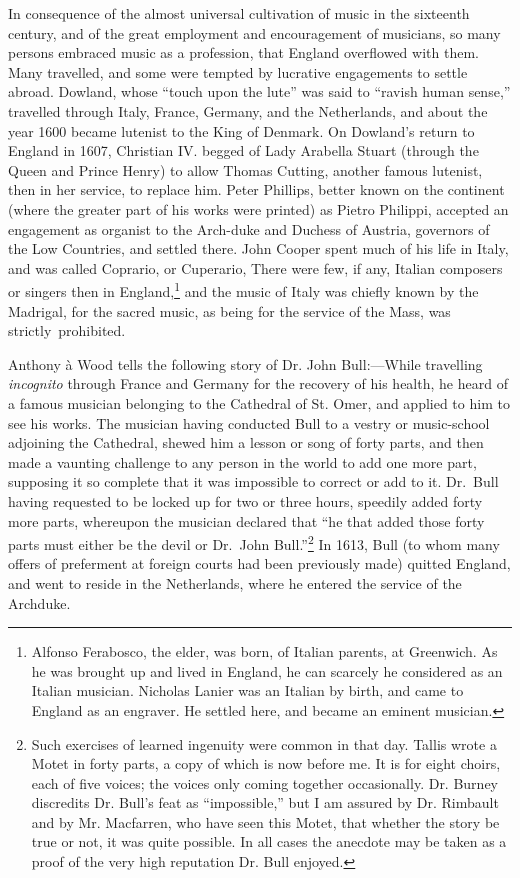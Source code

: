 In consequence of the almost universal cultivation of music in the sixteenth
century, and of the great employment and encouragement of musicians, so many
persons embraced music as a profession, that England overflowed with them.
Many travelled, and some were tempted by lucrative engagements to settle abroad.
Dowland, whose “touch upon the lute” was said to “ravish human sense,”
travelled through Italy, France, Germany, and the Netherlands, and about the
year 1600 became lutenist to the King of Denmark. On Dowland’s return to
England in 1607, Christian IV. begged of Lady Arabella Stuart (through the
Queen and Prince Henry) to allow Thomas Cutting, another famous lutenist, then
in her service, to replace him. Peter Phillips, better known on the continent
(where the greater part of his works were printed) as Pietro Philippi, accepted an
engagement as organist to the Arch-duke and Duchess of Austria, governors of
the Low Countries, and settled there. John Cooper spent much of his life in
Italy, and was called Coprario, or Cuperario, There were few, if any, Italian
composers or singers then in England,\footnote{\textit{}
Alfonso Ferabosco, the elder, was born, of Italian
parents, at Greenwich. As he was brought up and lived
in England, he can scarcely he considered as an Italian
musician. Nicholas Lanier was an Italian by birth, and
came to England as an engraver. He settled here, and
became an eminent musician.}
and the music of Italy was chiefly known
by the Madrigal, for the sacred music, as being for the service of the Mass, was
strictly~prohibited.
\pagebreak

Anthony à Wood tells the following story of Dr. John Bull:—While
travelling \textit{incognito} through France and Germany for the recovery of his health,
he heard of a famous musician belonging to the Cathedral of St. Omer, and
applied to him to see his works. The musician having conducted Bull to a vestry
or music-school adjoining the Cathedral, shewed him a lesson or song of forty
parts, and then made a vaunting challenge to any person in the world to add one
more part, supposing it so complete that it was impossible to correct or add to it.
Dr.~Bull having requested to be locked up for two or three hours, speedily added
forty more parts, whereupon the musician declared that “he that added those
forty parts must either be the devil or Dr.~John Bull.”\footnote{\textit{}
Such exercises of learned ingenuity were common in
that day. Tallis wrote a Motet in forty parts, a copy of
which is now before me. It is for eight choirs, each of
five voices; the voices only coming together occasionally.
Dr. Burney discredits Dr. Bull’s feat as “impossible,”
but I am assured by Dr. Rimbault and by Mr. Macfarren,
who have seen this Motet, that whether the story be true
or not, it was quite possible. In all cases the anecdote
may be taken as a proof of the very high reputation Dr.
Bull enjoyed.}
In 1613, Bull (to
whom many offers of preferment at foreign courts had been previously made)
quitted England, and went to reside in the Netherlands, where he entered the
service of the Archduke.

